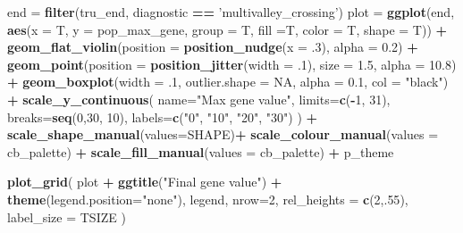 \documentclass[]{book}
\newenvironment{Shaded}{\begin{snugshade}}{\end{snugshade}}
\newcommand{\DataTypeTok}[1]{\textcolor[rgb]{0.13,0.29,0.53}{#1}}
\newcommand{\DecValTok}[1]{\textcolor[rgb]{0.00,0.00,0.81}{#1}}
\newcommand{\FloatTok}[1]{\textcolor[rgb]{0.00,0.00,0.81}{#1}}
\newcommand{\KeywordTok}[1]{\textcolor[rgb]{0.13,0.29,0.53}{\textbf{#1}}}
\newcommand{\NormalTok}[1]{#1}
\newcommand{\OperatorTok}[1]{\textcolor[rgb]{0.81,0.36,0.00}{\textbf{#1}}}
\newcommand{\OtherTok}[1]{\textcolor[rgb]{0.56,0.35,0.01}{#1}}
\newcommand{\StringTok}[1]{\textcolor[rgb]{0.31,0.60,0.02}{#1}}
\begin{document}
\begin{Shaded}
\begin{Highlighting}[]
\NormalTok{end =}\StringTok{ }\KeywordTok{filter}\NormalTok{(tru_end, diagnostic }\OperatorTok{==}\StringTok{ 'multivalley_crossing'}\NormalTok{)}
\NormalTok{plot =}\StringTok{ }\KeywordTok{ggplot}\NormalTok{(end, }\KeywordTok{aes}\NormalTok{(}\DataTypeTok{x =}\NormalTok{ T, }\DataTypeTok{y =}\NormalTok{ pop_max_gene, }\DataTypeTok{group =}\NormalTok{ T, }\DataTypeTok{fill =}\NormalTok{T, }\DataTypeTok{color =}\NormalTok{ T, }\DataTypeTok{shape =}\NormalTok{ T)) }\OperatorTok{+}
\StringTok{  }\KeywordTok{geom_flat_violin}\NormalTok{(}\DataTypeTok{position =} \KeywordTok{position_nudge}\NormalTok{(}\DataTypeTok{x =} \FloatTok{.3}\NormalTok{), }\DataTypeTok{alpha =} \FloatTok{0.2}\NormalTok{) }\OperatorTok{+}
\StringTok{  }\KeywordTok{geom_point}\NormalTok{(}\DataTypeTok{position =} \KeywordTok{position_jitter}\NormalTok{(}\DataTypeTok{width =} \FloatTok{.1}\NormalTok{), }\DataTypeTok{size =} \FloatTok{1.5}\NormalTok{, }\DataTypeTok{alpha =} \FloatTok{10.8}\NormalTok{) }\OperatorTok{+}
\StringTok{  }\KeywordTok{geom_boxplot}\NormalTok{(}\DataTypeTok{width =} \FloatTok{.1}\NormalTok{, }\DataTypeTok{outlier.shape =} \OtherTok{NA}\NormalTok{, }\DataTypeTok{alpha =} \FloatTok{0.1}\NormalTok{, }\DataTypeTok{col =} \StringTok{"black"}\NormalTok{) }\OperatorTok{+}
\StringTok{  }\KeywordTok{scale_y_continuous}\NormalTok{(}
    \DataTypeTok{name=}\StringTok{"Max gene value"}\NormalTok{,}
    \DataTypeTok{limits=}\KeywordTok{c}\NormalTok{(}\OperatorTok{-}\DecValTok{1}\NormalTok{, }\DecValTok{31}\NormalTok{),}
    \DataTypeTok{breaks=}\KeywordTok{seq}\NormalTok{(}\DecValTok{0}\NormalTok{,}\DecValTok{30}\NormalTok{, }\DecValTok{10}\NormalTok{),}
    \DataTypeTok{labels=}\KeywordTok{c}\NormalTok{(}\StringTok{"0"}\NormalTok{, }\StringTok{"10"}\NormalTok{, }\StringTok{"20"}\NormalTok{, }\StringTok{"30"}\NormalTok{)}
\NormalTok{  ) }\OperatorTok{+}
\StringTok{  }\KeywordTok{scale_shape_manual}\NormalTok{(}\DataTypeTok{values=}\NormalTok{SHAPE)}\OperatorTok{+}
\StringTok{  }\KeywordTok{scale_colour_manual}\NormalTok{(}\DataTypeTok{values =}\NormalTok{ cb_palette) }\OperatorTok{+}
\StringTok{  }\KeywordTok{scale_fill_manual}\NormalTok{(}\DataTypeTok{values =}\NormalTok{ cb_palette) }\OperatorTok{+}
\StringTok{  }\NormalTok{p_theme}

\KeywordTok{plot_grid}\NormalTok{(}
\NormalTok{  plot }\OperatorTok{+}
\StringTok{    }\KeywordTok{ggtitle}\NormalTok{(}\StringTok{"Final gene value"}\NormalTok{) }\OperatorTok{+}
\StringTok{    }\KeywordTok{theme}\NormalTok{(}\DataTypeTok{legend.position=}\StringTok{"none"}\NormalTok{),}
\NormalTok{  legend,}
  \DataTypeTok{nrow=}\DecValTok{2}\NormalTok{,}
  \DataTypeTok{rel_heights =} \KeywordTok{c}\NormalTok{(}\DecValTok{2}\NormalTok{,.}\DecValTok{55}\NormalTok{),}
  \DataTypeTok{label_size =}\NormalTok{ TSIZE}
\NormalTok{)}
\end{Highlighting}
\end{Shaded}
\end{document}
